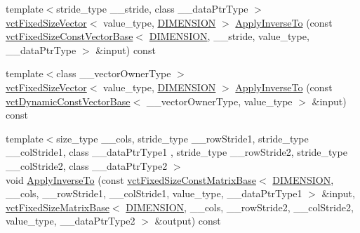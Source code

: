 \begin{DoxyCompactItemize}
\item 
{\footnotesize template$<$stride\+\_\+type \+\_\+\+\_\+stride, class \+\_\+\+\_\+data\+Ptr\+Type $>$ }\\\hyperlink{classvct_fixed_size_vector}{vct\+Fixed\+Size\+Vector}$<$ value\+\_\+type, \hyperlink{classvct_quaternion_rotation3_base_a729ac03acdd5949ecf382629e563d2a0a9417132a8a6849e18439d903ae6a1f18}{D\+I\+M\+E\+N\+S\+I\+O\+N} $>$ \hyperlink{classvct_quaternion_rotation3_base_a0b8f96ed4e769aab1d14769de116bf2b}{Apply\+Inverse\+To} (const \hyperlink{classvct_fixed_size_const_vector_base}{vct\+Fixed\+Size\+Const\+Vector\+Base}$<$ \hyperlink{classvct_quaternion_rotation3_base_a729ac03acdd5949ecf382629e563d2a0a9417132a8a6849e18439d903ae6a1f18}{D\+I\+M\+E\+N\+S\+I\+O\+N}, \+\_\+\+\_\+stride, value\+\_\+type, \+\_\+\+\_\+data\+Ptr\+Type $>$ \&input) const 
\item 
{\footnotesize template$<$class \+\_\+\+\_\+vector\+Owner\+Type $>$ }\\\hyperlink{classvct_fixed_size_vector}{vct\+Fixed\+Size\+Vector}$<$ value\+\_\+type, \hyperlink{classvct_quaternion_rotation3_base_a729ac03acdd5949ecf382629e563d2a0a9417132a8a6849e18439d903ae6a1f18}{D\+I\+M\+E\+N\+S\+I\+O\+N} $>$ \hyperlink{classvct_quaternion_rotation3_base_ae1df006c81b202fa7015879c8c91448a}{Apply\+Inverse\+To} (const \hyperlink{classvct_dynamic_const_vector_base}{vct\+Dynamic\+Const\+Vector\+Base}$<$ \+\_\+\+\_\+vector\+Owner\+Type, value\+\_\+type $>$ \&input) const 
\item 
{\footnotesize template$<$size\+\_\+type \+\_\+\+\_\+cols, stride\+\_\+type \+\_\+\+\_\+row\+Stride1, stride\+\_\+type \+\_\+\+\_\+col\+Stride1, class \+\_\+\+\_\+data\+Ptr\+Type1 , stride\+\_\+type \+\_\+\+\_\+row\+Stride2, stride\+\_\+type \+\_\+\+\_\+col\+Stride2, class \+\_\+\+\_\+data\+Ptr\+Type2 $>$ }\\void \hyperlink{classvct_quaternion_rotation3_base_a50ed1dcc4a0a0b748bb0f17b481e4584}{Apply\+Inverse\+To} (const \hyperlink{classvct_fixed_size_const_matrix_base}{vct\+Fixed\+Size\+Const\+Matrix\+Base}$<$ \hyperlink{classvct_quaternion_rotation3_base_a729ac03acdd5949ecf382629e563d2a0a9417132a8a6849e18439d903ae6a1f18}{D\+I\+M\+E\+N\+S\+I\+O\+N}, \+\_\+\+\_\+cols, \+\_\+\+\_\+row\+Stride1, \+\_\+\+\_\+col\+Stride1, value\+\_\+type, \+\_\+\+\_\+data\+Ptr\+Type1 $>$ \&input, \hyperlink{classvct_fixed_size_matrix_base}{vct\+Fixed\+Size\+Matrix\+Base}$<$ \hyperlink{classvct_quaternion_rotation3_base_a729ac03acdd5949ecf382629e563d2a0a9417132a8a6849e18439d903ae6a1f18}{D\+I\+M\+E\+N\+S\+I\+O\+N}, \+\_\+\+\_\+cols, \+\_\+\+\_\+row\+Stride2, \+\_\+\+\_\+col\+Stride2, value\+\_\+type, \+\_\+\+\_\+data\+Ptr\+Type2 $>$ \&output) const 

\end{DoxyCompactItemize}
